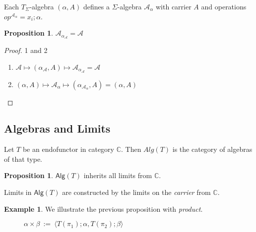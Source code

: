 \documentclass{amsart}
\theoremstyle{definition}
\newtheorem{proposition}[thm]{Proposition}
\newtheorem{example}[thm]{Example}
\newcommand{\ca}{\mathcal A} %
\begin{document}
Each $T_\Sigma$-algebra $(\alpha, A)$ defines a $\Sigma$-algebra $\ca_\alpha$ with carrier $A$ and operations $op^{\ca_\alpha} = x_i;\alpha$. 

\begin{proposition} $\ca_{\alpha_\ca} = \ca$
\end{proposition}

\begin{proof} 1 and 2
\begin{enumerate}
\item $\ca \mapsto (\alpha_\ca, A) \mapsto \ca_{\alpha_\ca} = \ca$
\item $(\alpha, A) \mapsto \ca_\alpha \mapsto (\alpha_{\ca_\alpha}, A) = (\alpha, A)$
\end{enumerate}

\end{proof}

\subsection{Algebras and Limits}
Let $T$ be an endofunctor in category $\mathbb C$. Then $Alg(T)$ is the category of algebras of that type. 

\begin{proposition} $\mathsf{Alg}(T)$ inherits all limits from $\mathbb C$.
\end{proposition}

Limits in $\mathsf{Alg}(T)$ are constructed by the limits on the \textit{carrier} from $\mathbb C$.

\begin{example} We illustrate the previous proposition with \textit{product}.

\begin{figure}[ht]
\caption{$\alpha \times \beta ~:=~ \langle T(\pi_1);\alpha, T(\pi_2);\beta \rangle$ }
\end{figure}
\end{example}
\end{document}
